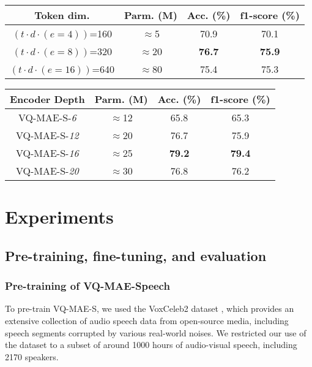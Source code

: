 \documentclass{article}
\begin{document}
\begin{table*}[t]
\begin{minipage}{.45\linewidth}
        \label{tab:dim}
            \begin{tabular}{c|ccc}
                Token dim.     & Parm. \small{(M)} & Acc. \small{(\%)} & f1-score \small{(\%)}\\ \hline
                $(t \cdot d \cdot (e=4))$=160                & $\approx$5 & 70.9           &  70.1        \\
                $(t \cdot d \cdot (e=8))$=320                & $\approx$20 &\textbf{76.7}           &     \textbf{75.9}       \\
                $(t \cdot d \cdot (e=16))$=640                & $\approx$80 & 75.4           &   75.3     
            \end{tabular}
    \end{minipage} 
    \hfill
    \begin{minipage}{.5\linewidth}
      \centering
        \caption{Performance of VQ-MAE-S on RAVDESS-Speech for different encoder depths. Masking method: Random time-frequency masking (Patch-\emph{tf}); Ratio: 80\%.}
        \label{tab:depth}
            \begin{tabular}{c|ccc}
                Encoder Depth     & Parm. \small{(M)} & Acc. \small{(\%)} & f1-score \small{(\%)}\\ \hline
                VQ-MAE-S-\emph{6}  & $\approx$12 & 65.8           &    65.3      \\
                VQ-MAE-S-\emph{12} & $\approx$20 & 76.7           &    75.9         \\
                VQ-MAE-S-\emph{16} & $\approx$25 & \textbf{79.2}           &  \textbf{79.4}      \\
                VQ-MAE-S-\emph{20} & $\approx$30 & 76.8 &  76.2      
            \end{tabular}
    \end{minipage}

\end{table*}

\section{Experiments}
\subsection{Pre-training, fine-tuning, and evaluation}   

\subsubsection{Pre-training of VQ-MAE-Speech}
\label{sec:pretrain_setting}
To pre-train VQ-MAE-S, we used the VoxCeleb2 dataset \cite{chung2018voxceleb2}, which provides an extensive collection of audio speech data from open-source media, including speech segments corrupted by various real-world noises. We restricted our use of the dataset to a subset of around 1000 hours of audio-visual speech, including 2170 speakers.
\end{document}
